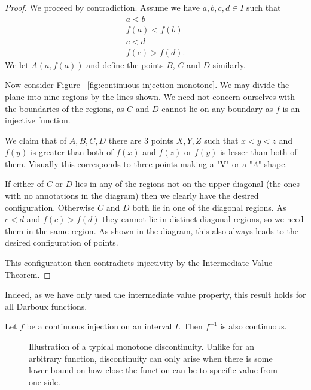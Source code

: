 \documentclass[]{article}
\begin{document}
\begin{proof}
	We proceed by contradiction. Assume we have $a,b,c,d \in I$ such that
	\begin{align*}
			a < b \\
			f(a) < f(b) \\
			c < d \\
			f(c) > f(d).
	\end{align*}
	We let $A(a,f(a))$ and define the points $B$, $C$ and $D$ similarly. 

	Now consider Figure ~\ref{fig:continuous-injection-monotone}. We may divide the plane into nine regions by the lines shown. We need not concern ourselves with the boundaries of the regions, as  $C$ and $D$ cannot lie on any boundary as $f$ is an injective function. 

	We claim that of $A, B, C, D$ there are 3 points $X, Y, Z$ such that $x < y < z$ and $f(y)$ is greater than both of  $f(x)$ and $f(z)$ or $f(y)$ is lesser than both of them. Visually this corresponds to  three points making a "V" or a "$\Lambda$" shape.

	If either of $C$ or $D$ lies in any of the regions not on the upper diagonal (the ones with no annotations in the diagram) then we clearly have the desired configuration. Otherwise $C$ and $D$ both lie in one of the diagonal regions. As $c < d$ and $f(c) > f(d)$ they cannot lie in distinct diagonal regions, so we need them in the same region. As shown in the diagram, this also always leads to the desired configuration of points.

	This configuration then contradicts injectivity by the Intermediate Value Theorem.
\end{proof}

Indeed, as we have only used the intermediate value property, this result holds for all Darboux functions.

\begin{thm}
		Let $f$ be a continuous injection on an interval $I$. Then $f^{-1}$ is also continuous.
\end{thm}

\begin{figure}[ht]
\centering
{}
\caption{Illustration of a typical monotone discontinuity. Unlike for an arbitrary function, discontinuity can only arise when there is some lower bound on how close the function can be to  specific value from one side.}
\label{fig:monotone-discontinuity}
\end{figure}
\end{document}
